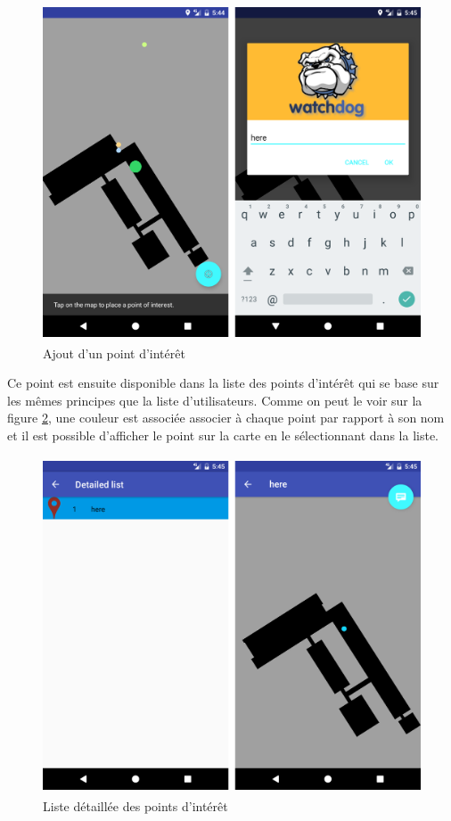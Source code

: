 \begin{figure}[H]
    \centering
    \includegraphics[height=10cm]{./img/screen4.png}
    \caption{Ajout d’un point d’intérêt}
    \label{screen4}
\end{figure}

Ce point est ensuite disponible dans la liste des points d’intérêt qui se base sur les mêmes principes que la liste d’utilisateurs. Comme on peut le voir sur la figure \ref{screen5}, une couleur est associée associer à chaque point par rapport à son nom et il est possible d’afficher le point sur la carte en le sélectionnant dans la liste.

\begin{figure}[H]
    \centering
    \includegraphics[height=10cm]{./img/screen5.png}
    \caption{Liste détaillée des points d’intérêt}
    \label{screen5}
\end{figure}

